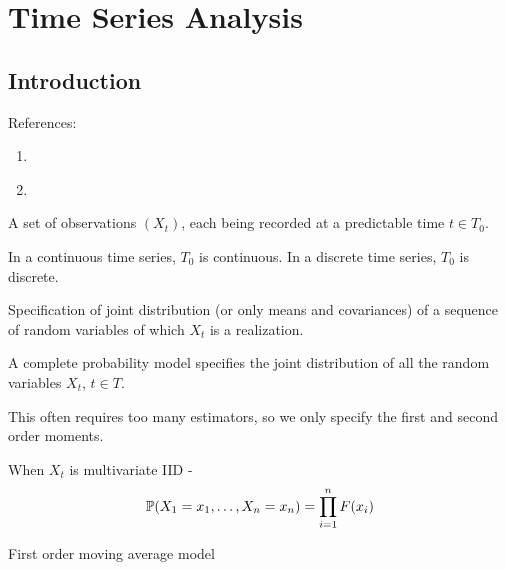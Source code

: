 
\chapter{Time Series Analysis}
\label{cha:time-series-analysis}

\section{Introduction}
\label{sec:introduction}



References: 
\begin{enumerate}
\item \citet{brockwell2009time}
\item \citet{brockwell2002introduction}
\end{enumerate}

\begin{defn}
  \label{defn:time_series:1}
  A set of observations $(X_{t})$, each being recorded at a predictable
  time $t \in T_{0}$.

  In a continuous time series, $T_{0}$ is continuous.  In a discrete
  time series, $T_{0}$ is discrete.
\end{defn}

\begin{defn}
  \label{defn:time_series:2}
  Specification of joint distribution (or only means and covariances)
  of a sequence of random variables of which $X_{t}$ is a realization.
\end{defn}

\begin{remark}
  A complete probability model specifies the joint distribution of all
  the random variables $X_{t}$, $t \in T$.

  This often requires too many estimators, so we only specify the
  first and second order moments.
\end{remark}

\begin{exmp}
  \label{defn:time_series:3}
  When $X_{t}$ is multivariate IID -
  \begin{equation}
    \label{eq:1}
    \Prob{X_{1} = x_{1}, \dots, X_{n} = x_{n}} = \prod_{i=1}^{n} F(x_{i})
  \end{equation}
\end{exmp}

\begin{exmp}
  \label{defn:time_series:4}
  First order moving average model
\end{exmp}

